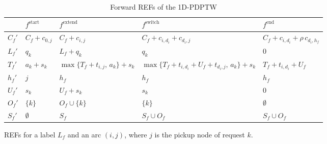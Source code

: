 \documentclass[preprint,11pt,authoryear]{elsarticle}
\begin{document}
\begin{table}[!ht]
\caption{Forward REFs of the 1D-PDPTW}
\label{tab:forward-refs}
\footnotesize
\renewcommand{\arraystretch}{1.6}
\setlength{\tabcolsep}{5pt}
\begin{tabularx}{\linewidth}{@{}l Y Y Y Y@{}}
\toprule
 & $f^{\mathrm{start}}$ & $f^{\mathrm{extend}}$ & $f^{\mathrm{switch}}$ & $f^{\mathrm{end}}$ \\
\midrule

$C_f'$
& $C_f + c_{0,j}$
& $C_f + c_{i,j}$
& $C_f + c_{i,d_i} + c_{d_i,j}$
& $C_f + c_{i,d_i} + \rho\, c_{d_i,h_f}$ \\

$L_f'$
& $q_k$
& $L_f + q_k$
& $q_k$
& $0$ \\

$T_f'$
& $a_k + s_k$
& $\max\{T_f + t_{i,j},\, a_k\} + s_k$
& $\max\{T_f + t_{i,d_i} + U_f + t_{d_i,j},\, a_k\} + s_k$
& $T_f + t_{i,d_i} + U_f$ \\

$h_f'$
& $j$
& $h_f$
& $h_f$
& $h_f$ \\

$U_f'$
& $s_k$
& $U_f + s_k$
& $s_k$
& $0$ \\

$O_f'$
& $\{k\}$
& $O_f \cup \{k\}$
& $\{k\}$
& $\emptyset$ \\

$S_f'$
& $\emptyset$
& $S_f$
& $S_f \cup O_f$
& $S_f \cup O_f$ \\

\bottomrule
\end{tabularx}
\par\smallskip
{\footnotesize\raggedright
REFs for a label $L_f$ and an arc $(i,j)$, where $j$ is the pickup node of request $k$.\par}
\end{table}
\end{document}
